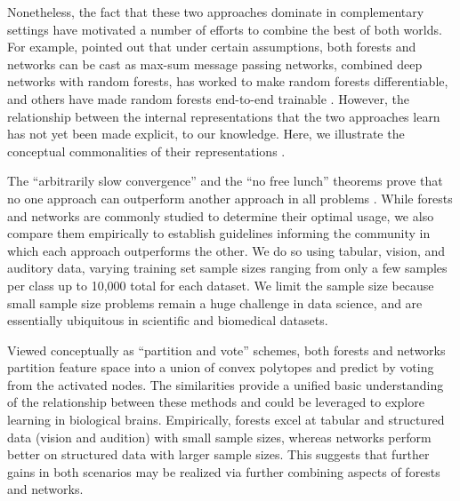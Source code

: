 Nonetheless, the fact that these two approaches dominate in complementary settings have motivated a number of efforts to combine the best of both worlds. 
For example, \citet{Patel2015-jg} pointed out that under certain assumptions, both forests and networks can be cast as max-sum message passing networks, \citet{Zhou2018-ii} combined deep networks with random forests, \citet{Shen2019-mq} has worked to make random forests differentiable, and others have made random forests end-to-end trainable \citep{Carreira-Perpinan2018-py, Hehn2019-kh}. However, the relationship between the internal representations that the two approaches learn has not yet been made explicit, to our knowledge. Here, we illustrate the conceptual commonalities of their representations \citep{Priebe2020.04.29.068460}.

The ``arbitrarily slow convergence'' and the ``no free lunch'' theorems prove that no one approach can outperform another approach in all problems \citep{slow_conv, lunch}. While forests and networks are commonly studied to determine their optimal usage, we also compare them empirically to establish guidelines informing the community in which each approach outperforms the other. We do so using tabular, vision, and auditory data, varying training set sample sizes ranging from only a few samples per class up to 10,000 total for each dataset.
We limit the sample size because small sample size problems remain a huge challenge in data science, and are essentially ubiquitous in scientific and biomedical datasets.

Viewed conceptually as ``partition and vote'' schemes, both forests and networks partition feature space into a union of convex polytopes and predict by voting from the activated nodes. The similarities provide a unified basic understanding of the relationship between these methods and could be leveraged to explore learning in biological brains. 
Empirically, forests excel at tabular and structured data (vision and audition) with small sample sizes, whereas networks perform better on structured data with larger sample sizes. This suggests that further gains in both scenarios may be realized via further combining aspects of forests and networks.


